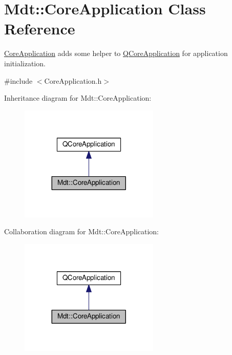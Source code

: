 \hypertarget{class_mdt_1_1_core_application}{}\section{Mdt\+:\+:Core\+Application Class Reference}
\label{class_mdt_1_1_core_application}


\hyperlink{class_mdt_1_1_core_application}{Core\+Application} adds some helper to \hyperlink{class_q_core_application}{Q\+Core\+Application} for application initialization.  




{\ttfamily \#include $<$Core\+Application.\+h$>$}



Inheritance diagram for Mdt\+:\+:Core\+Application\+:
\nopagebreak
\begin{figure}[H]
\begin{center}
\leavevmode
\includegraphics[width=188pt]{class_mdt_1_1_core_application__inherit__graph}
\end{center}
\end{figure}


Collaboration diagram for Mdt\+:\+:Core\+Application\+:
\nopagebreak
\begin{figure}[H]
\begin{center}
\leavevmode
\includegraphics[width=188pt]{class_mdt_1_1_core_application__coll__graph}
\end{center}
\end{figure}
